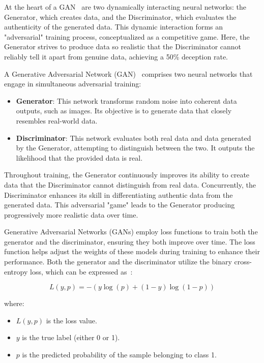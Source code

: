 \documentclass[12pt,a4paper]{report}
\begin{document}
At the heart of a GAN~\cite{goodfellow2014generative} are two dynamically interacting neural networks: the Generator, which creates data, and the Discriminator, which evaluates the authenticity of the generated data. This dynamic interaction forms an "adversarial" training process, conceptualized as a competitive game. Here, the Generator strives to produce data so realistic that the Discriminator cannot reliably tell it apart from genuine data, achieving a 50\% deception rate.

A Generative Adversarial Network (GAN)~\cite{goodfellow2014generative} comprises two neural networks that engage in simultaneous adversarial training:

\begin{itemize}
  \item \textbf{Generator}: This network transforms random noise into coherent data outputs, such as images. Its objective is to generate data that closely resembles real-world data.
  \item \textbf{Discriminator}: This network evaluates both real data and data generated by the Generator, attempting to distinguish between the two. It outputs the likelihood that the provided data is real.
\end{itemize}

Throughout training, the Generator continuously improves its ability to create data that the Discriminator cannot distinguish from real data. Concurrently, the Discriminator enhances its skill in differentiating authentic data from the generated data. This adversarial "game" leads to the Generator producing progressively more realistic data over time.

Generative Adversarial Networks (GANs) employ loss functions to train both the generator and the discriminator, ensuring they both improve over time. The loss function helps adjust the weights of these models during training to enhance their performance. Both the generator and the discriminator utilize the binary cross-entropy loss, which can be expressed as~\cite{gan}:

\begin{equation}
  L(y, p) = - (y \log(p) + (1 - y) \log(1 - p))
\end{equation}

where:
\begin{itemize}
  \item \( L(y, p) \) is the loss value.
  \item \( y \) is the true label (either 0 or 1).
  \item \( p \) is the predicted probability of the sample belonging to class 1.
\end{itemize}
\end{document}
